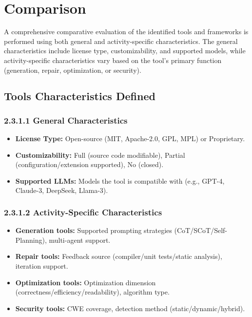 \documentclass[11pt,a4paper]{article}
\begin{document}
\section{Comparison}
\label{sec:comparison}

A comprehensive comparative evaluation of the identified tools and frameworks is performed using both general and activity-specific characteristics. The general characteristics include license type, customizability, and supported models, while activity-specific characteristics vary based on the tool's primary function (generation, repair, optimization, or security).

\subsection{Tools Characteristics Defined}
\label{sec:char_defined}

\subsubsection*{2.3.1.1 General Characteristics}

\begin{itemize}[leftmargin=*]
\item \textbf{License Type:} Open-source (MIT, Apache-2.0, GPL, MPL) or Proprietary.
\item \textbf{Customizability:} Full (source code modifiable), Partial (configuration/extension supported), No (closed).
\item \textbf{Supported LLMs:} Models the tool is compatible with (e.g., GPT-4, Claude-3, DeepSeek, Llama-3).
\end{itemize}

\subsubsection*{2.3.1.2 Activity-Specific Characteristics}

\begin{itemize}[leftmargin=*]
\item \textbf{Generation tools:} Supported prompting strategies (CoT/SCoT/Self-Planning), multi-agent support.
\item \textbf{Repair tools:} Feedback source (compiler/unit tests/static analysis), iteration support.
\item \textbf{Optimization tools:} Optimization dimension (correctness/efficiency/readability), algorithm type.
\item \textbf{Security tools:} CWE coverage, detection method (static/dynamic/hybrid).
\end{itemize}
\end{document}
